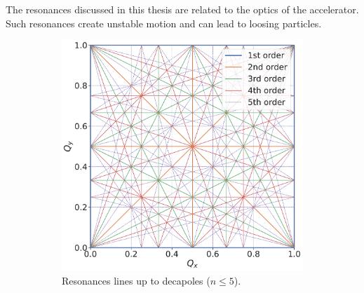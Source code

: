 \section{}


\subsection{}

The resonances discussed in this thesis are related to the optics of the accelerator.
Such resonances create unstable motion and can lead to loosing particles.

\begin{figure}[!htb]
    \centering
    \begin{subfigure}[b]{0.6\textwidth}
        \includegraphics[width=1\textwidth]{images/resonance_diagram_n5.pdf}
        \caption{Resonances lines up to decapoles ($n \leq 5$).}
        \label{fig:resonances:diagram_n5}
    \end{subfigure}
    \\
    \begin{subfigure}[b]{0.6\textwidth}

\end{subfigure}
\end{figure}
